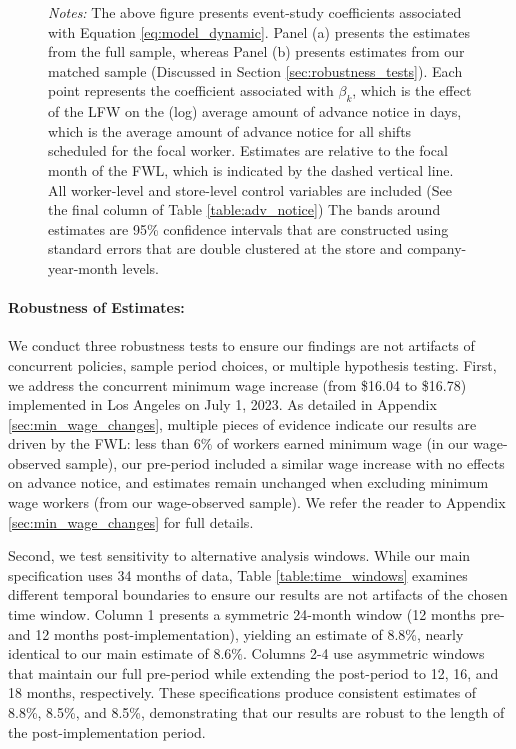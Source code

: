 \documentclass[letterpaper,11pt,leqno]{article}
\theoremstyle{paper}
\newcommand{\note}[2][]{\parbox{\textwidth}{\footnotesize\vspace*{10pt}\textit{#1}#2}}
\begin{document}
\begin{figure}[h]
\note{\scriptsize \singlespacing \textit{Notes:} The above figure presents event-study coefficients associated with Equation \ref{eq:model_dynamic}. Panel (a) presents the estimates from the full sample, whereas Panel (b) presents estimates from our matched sample (Discussed in Section \ref{sec:robustness_tests}). Each point represents the coefficient associated with $\beta_{k}$, which is the effect of the LFW on the (log) average amount of advance notice in days, which is the average amount of advance notice for all shifts scheduled for the focal worker. Estimates are relative to the focal month of the FWL, which is indicated by the dashed vertical line. All worker-level and store-level control variables are included (See the final column of Table \ref{table:adv_notice}) The bands around estimates are 95\% confidence intervals that are constructed using standard errors that are double clustered at the store and company-year-month levels.}
\label{f:event_study_workers}
\end{figure}

\paragraph{Robustness of Estimates:}
We conduct three robustness tests to ensure our findings are not artifacts of concurrent policies, sample period choices, or multiple hypothesis testing. First, we address the concurrent minimum wage increase (from \$16.04 to \$16.78) implemented in Los Angeles on July 1, 2023. As detailed in Appendix \ref{sec:min_wage_changes}, multiple pieces of evidence indicate our results are driven by the FWL: less than 6\% of workers earned minimum wage (in our wage-observed sample), our pre-period included a similar wage increase with no effects on advance notice, and estimates remain unchanged when excluding minimum wage workers (from our wage-observed sample). We refer the reader to Appendix \ref{sec:min_wage_changes} for full details.

Second, we test sensitivity to alternative analysis windows. While our main specification uses 34 months of data, Table \ref{table:time_windows} examines different temporal boundaries to ensure our results are not artifacts of the chosen time window. Column 1 presents a symmetric 24-month window (12 months pre- and 12 months post-implementation), yielding an estimate of 8.8\%, nearly identical to our main estimate of 8.6\%. Columns 2-4 use asymmetric windows that maintain our full pre-period while extending the post-period to 12, 16, and 18 months, respectively. These specifications produce consistent estimates of 8.8\%, 8.5\%, and 8.5\%, demonstrating that our results are robust to the length of the post-implementation period.
\end{document}
